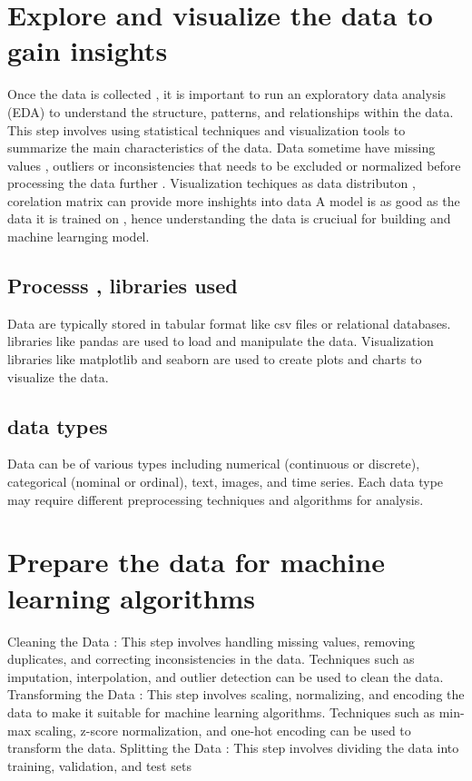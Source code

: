 \documentclass{article}
\begin{document}
\section{Explore and visualize the data to gain insights}
Once the data is collected , it is important to run an exploratory data analysis (EDA) to understand the structure, patterns, and relationships within the data. This step involves using statistical techniques and visualization tools to summarize the main characteristics of the data. Data sometime have missing values , outliers or inconsistencies that needs to be excluded or normalized before processing the data further . Visualization techiques as data distributon , corelation matrix can provide more inshights into data 
A model is as good as the data it is trained on , hence understanding the data is cruciual for building and machine learnging model.
\subsection{Processs , libraries used}
Data are typically stored in tabular format like csv files or relational databases. libraries like pandas are used to load and manipulate the data. Visualization libraries like matplotlib and seaborn are used to create plots and charts to visualize the data.
\subsection{data types}
Data can be of various types including numerical (continuous or discrete), categorical (nominal or ordinal), text, images, and time series. Each data type may require different preprocessing techniques and algorithms for analysis.
\section{Prepare the data for machine learning algorithms}
Cleaning the Data : This step involves handling missing values, removing duplicates, and correcting inconsistencies in the data. Techniques such as imputation, interpolation, and outlier detection can be used to clean the data.
Transforming the Data : This step involves scaling, normalizing, and encoding the data to make it suitable for machine learning algorithms. Techniques such as min-max scaling, z-score normalization, and one-hot encoding can be used to transform the data.
Splitting the Data : This step involves dividing the data into training, validation, and test sets
\end{document}
